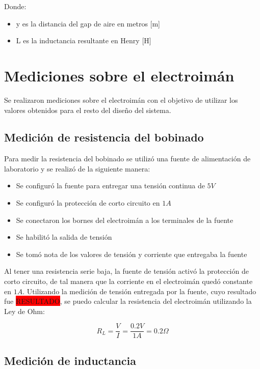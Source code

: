 \noindent Donde:
\begin{itemize}
	\item y es la distancia del gap de aire en metros [m]
	\item L es la inductancia resultante en Henry [H]
\end{itemize}

\section{Mediciones sobre el electroimán}

\noindent Se realizaron mediciones sobre el electroimán con el objetivo de utilizar los valores obtenidos para el resto del diseño del sistema.

\subsection{Medición de resistencia del bobinado}

\noindent Para medir la resistencia del bobinado se utilizó una fuente de alimentación de laboratorio y se realizó de la siguiente manera:

\begin{itemize}
	\item Se configuró la fuente para entregar una tensión continua de $5V$
	\item Se configuró la protección de corto circuito en $1A$
	\item Se conectaron los bornes del electroimán a los terminales de la fuente
	\item Se habilitó la salida de tensión
	\item Se tomó nota de los valores de tensión y corriente que entregaba la fuente
\end{itemize}

\noindent Al tener una resistencia serie baja, la fuente de tensión activó la protección de corto circuito, de tal manera que la corriente en el electroimán quedó constante en $1A$. Utilizando la medición de tensión entregada por la fuente, cuyo resultado fue \colorbox{red}{RESULTADO}, se puedo calcular la resistencia del electroimán utilizando la Ley de Ohm:

\begin{equation}
	R_{L}=\frac{V}{I}=\frac{0.2V}{1A}=0.2\Omega
\end{equation}

\subsection{Medición de inductancia}

